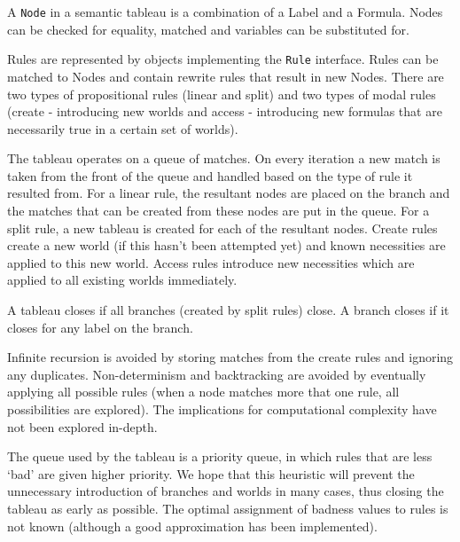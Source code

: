 A {\tt Node} in a semantic tableau is a combination of a Label and a Formula.
Nodes can be checked for equality, matched and variables can be substituted
for.

Rules are represented by objects implementing the {\tt Rule} interface. Rules
can be matched to Nodes and contain rewrite rules that result in new Nodes.
There are two types of propositional rules (linear and split) and two types of
modal rules (create - introducing new worlds and access - introducing new
formulas that are necessarily true in a certain set of worlds).

The tableau operates on a queue of matches. On every iteration a new match is
taken from the front of the queue and handled based on the type of rule it
resulted from. For a linear rule, the resultant nodes are placed on the branch
and the matches that can be created from these nodes are put in the queue. For
a split rule, a new tableau is created for each of the resultant nodes. Create
rules create a new world (if this hasn't been attempted yet) and known
necessities are applied to this new world. Access rules introduce new
necessities which are applied to all existing worlds immediately.

A tableau closes if all branches (created by split rules) close. A branch
closes if it closes for any label on the branch.

Infinite recursion is avoided by storing matches from the create rules and
ignoring any duplicates. Non-determinism and backtracking are avoided by
eventually applying all possible rules (when a node matches more that one
rule, all possibilities are explored). The implications for computational
complexity have not been explored in-depth.

The queue used by the tableau is a priority queue, in which rules that are
less `bad' are given higher priority. We hope that this heuristic will prevent
the unnecessary introduction of branches and worlds in many cases, thus
closing the tableau as early as possible. The optimal assignment of badness
values to rules is not known (although a good approximation has been
implemented).
